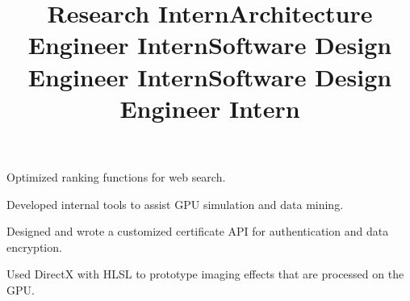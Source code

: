 \begin{resume}
\title{Research Intern}
\begin{position}
Optimized ranking functions for web search.
\end{position}

\title{Architecture Engineer Intern}
\begin{position}
Developed internal tools to assist GPU simulation and data mining.  
\end{position}

\title{Software Design Engineer Intern}
\begin{position}
Designed and wrote a customized certificate API for authentication
and data encryption.
\end{position}

\title{Software Design Engineer Intern}
\begin{position}
Used DirectX with HLSL to prototype imaging effects that are
processed on the GPU.
\end{position}






\begin{formatb}
  \\
  \body\\
\end{formatb}


\end{resume}
